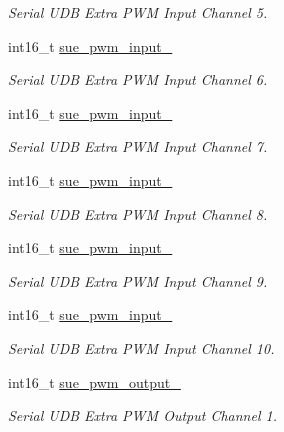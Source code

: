 \begin{DoxyCompactItemize}
\begin{DoxyCompactList}\small\item\em Serial U\+D\+B Extra P\+W\+M Input Channel 5. \end{DoxyCompactList}\item 
int16\+\_\+t \hyperlink{struct____mavlink__serial__udb__extra__f2__b__t_a6dfe7d85ab8b6c596a81ae782b2e1973}{sue\+\_\+pwm\+\_\+input\+\_}
\begin{DoxyCompactList}\small\item\em Serial U\+D\+B Extra P\+W\+M Input Channel 6. \end{DoxyCompactList}\item 
int16\+\_\+t \hyperlink{struct____mavlink__serial__udb__extra__f2__b__t_a54edd1dc902fa73510254dd014b44792}{sue\+\_\+pwm\+\_\+input\+\_}
\begin{DoxyCompactList}\small\item\em Serial U\+D\+B Extra P\+W\+M Input Channel 7. \end{DoxyCompactList}\item 
int16\+\_\+t \hyperlink{struct____mavlink__serial__udb__extra__f2__b__t_a52de7ecb1b9dc415282597990f8a6007}{sue\+\_\+pwm\+\_\+input\+\_}
\begin{DoxyCompactList}\small\item\em Serial U\+D\+B Extra P\+W\+M Input Channel 8. \end{DoxyCompactList}\item 
int16\+\_\+t \hyperlink{struct____mavlink__serial__udb__extra__f2__b__t_a0b12a3a3ffd3d2a64b7c8e76be21bfa7}{sue\+\_\+pwm\+\_\+input\+\_}
\begin{DoxyCompactList}\small\item\em Serial U\+D\+B Extra P\+W\+M Input Channel 9. \end{DoxyCompactList}\item 
int16\+\_\+t \hyperlink{struct____mavlink__serial__udb__extra__f2__b__t_a4c6980c162fe6a860e446111ade566a2}{sue\+\_\+pwm\+\_\+input\+\_}
\begin{DoxyCompactList}\small\item\em Serial U\+D\+B Extra P\+W\+M Input Channel 10. \end{DoxyCompactList}\item 
int16\+\_\+t \hyperlink{struct____mavlink__serial__udb__extra__f2__b__t_ac15b4c6b1381cc451fe14d1670838251}{sue\+\_\+pwm\+\_\+output\+\_}
\begin{DoxyCompactList}\small\item\em Serial U\+D\+B Extra P\+W\+M Output Channel 1. \end{DoxyCompactList}\item 

\end{DoxyCompactItemize}
